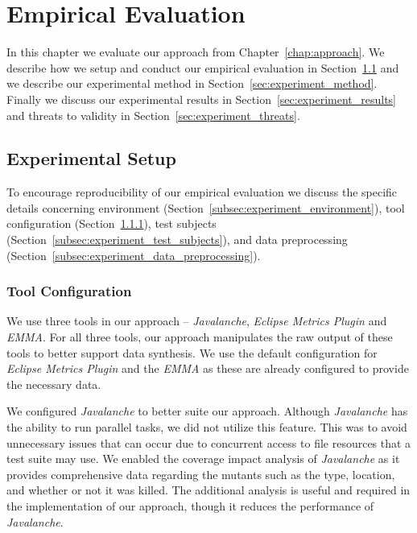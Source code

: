 \chapter{Empirical Evaluation}
\label{chap:experiment}
In this chapter we evaluate our approach from Chapter~\ref{chap:approach}. We describe how we setup and conduct our empirical evaluation in Section~\ref{sec:experiment_setup} and we describe our experimental method in Section~\ref{sec:experiment_method}. Finally we discuss our experimental results in Section~\ref{sec:experiment_results} and threats to validity in Section~\ref{sec:experiment_threats}.


\section{Experimental Setup}
\label{sec:experiment_setup}
To encourage reproducibility of our empirical evaluation we discuss the specific details concerning environment (Section~\ref{subsec:experiment_environment}), tool configuration (Section~\ref{subsec:experiment_tool_configuration}), test subjects (Section~\ref{subsec:experiment_test_subjects}), and data preprocessing (Section~\ref{subsec:experiment_data_preprocessing}).


\subsection{Tool Configuration}
\label{subsec:experiment_tool_configuration}
We use three tools in our approach -- \emph{Javalanche}, \emph{Eclipse Metrics Plugin} and \emph{EMMA}. For all three tools, our approach manipulates the raw output of these tools to better support data synthesis. We use the default configuration for \emph{Eclipse Metrics Plugin} and the \emph{EMMA} as these are already configured to provide the necessary data.

We configured \emph{Javalanche} to better suite our approach. Although \emph{Javalanche} has the ability to run parallel tasks, we did not utilize this feature. This was to avoid unnecessary issues that can occur due to concurrent access to file resources that a test suite may use. We enabled the coverage impact analysis of \emph{Javalanche} as it provides comprehensive data regarding the mutants such as the type, location, and whether or not it was killed. The additional analysis is useful and required in the implementation of our approach, though it reduces the performance of \emph{Javalanche}.

